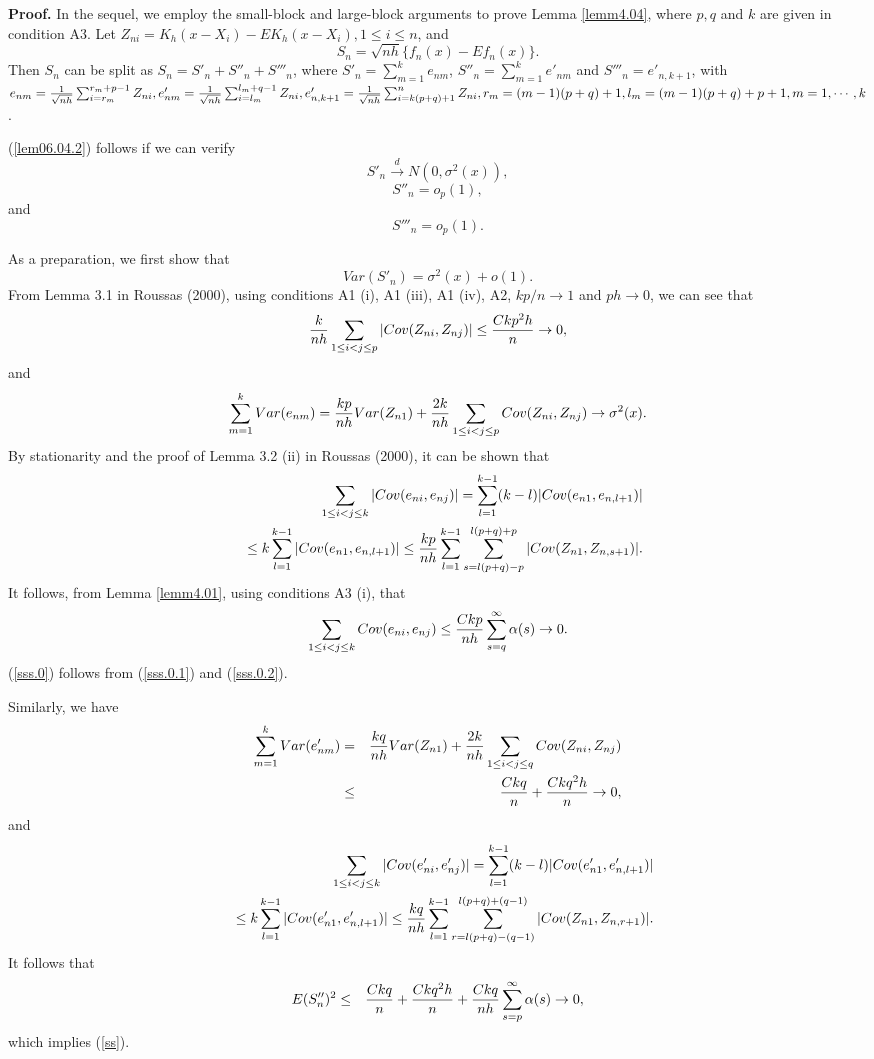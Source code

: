 \documentclass[12pt]{article}
\newcommand{\tod}{\stackrel{d}{\longrightarrow}}
\def\be{\begin{equation}}
\def\ee{\end{equation}}
\def\nn{\nonumber}
\def\bea{\begin{eqnarray}}
\def\eea{\end{eqnarray}}
\begin{document}
{\bf Proof. } In the sequel, we employ the small-block and large-block arguments to prove Lemma \ref{lemm4.04}, where $p, q$ and $k$ are given in condition A3. Let $Z_{ni}=K_h(x-X_i)-EK_h(x-X_i), 1\leq i\leq n$, and
\[
S_n=\sqrt{nh}\{f_n(x)-Ef_n(x)\}.
\]
Then $S_n$ can be split as
$S_n=S'_n+S''_n+S'''_n$, where
$S'_n=\sum_{m=1}^ke_{nm}$,
$S''_n=\sum_{m=1}^ke'_{nm}$ and
$S'''_n=e'_{n, k+1}$,
with
$e_{nm}={1\over \sqrt{nh}}\sum_{i=r_m}^{r_m+p-1}Z_{ni},
e'_{nm}={1\over \sqrt{nh}}\sum_{i=l_m}^{l_m+q-1}Z_{ni},
e'_{n, k+1}={1\over \sqrt{nh}}\sum_{i=k(p+q)+1}^nZ_{ni},
r_m=(m-1)(p+q)+1,l_m=(m-1)(p+q)+p+1, m=1,\cdots, k$.


 (\ref{lem06.04.2}) follows if we can verify
 \be S'_n
\tod N(0, \sigma^2(x)),\label{s}
\ee
\be
S''_n=o_p(1),\label{ss}
\ee
and
\be
S'''_n=o_p(1).\label{sss}
\ee

As a preparation, we first show that
\be
Var(S'_n)=\sigma^2(x)+o(1).\label{sss.0}
\ee
From Lemma 3.1 in Roussas (2000), using conditions A1 (i), A1 (iii), A1 (iv), A2, $kp/n\to 1$ and $ph\to 0$, we can see that
\[
{k\over nh}\sum_{1\leq i<j\leq p}  |Cov(Z_{ni}, Z_{nj})|\leq {Ckp^2h\over n}\to 0,
\]
and
\be
\sum_{m=1}^k Var(e_{nm})={kp\over nh} Var(Z_{n1})+{2k\over nh}\sum_{1\leq i<j\leq p}  Cov(Z_{ni}, Z_{nj}) \to \sigma^2(x).  \label{sss.0.1}
\ee
By stationarity and the proof of Lemma 3.2 (ii) in Roussas (2000), it can be shown that
\bea
&& \sum_{1\leq i<j\leq k}|Cov(e_{ni}, e_{nj})| = \sum^{k-1}_{l=1}(k-l)|Cov(e_{n1}, e_{n, l+1})|\nn\\
&&\leq k\sum^{k-1}_{l=1}|Cov(e_{n1}, e_{n, l+1})|
\leq  {kp\over nh}\sum^{k-1}_{l=1} \sum_{s=l(p+q)-p}^{l(p+q)+p}|Cov(Z_{n1}, Z_{n, s+1})|.\nn
\eea
It follows, from Lemma \ref{lemm4.01}, using conditions A3 (i), that
\be
 \sum_{1\leq i<j\leq k}Cov(e_{ni}, e_{nj}) \leq  {Ckp\over nh} \sum^{\infty}_{s=q}  \alpha (s) \to 0.
 \label{sss.0.2}
\ee
(\ref{sss.0}) follows from  (\ref{sss.0.1}) and (\ref{sss.0.2}).

Similarly, we have
\bea
\sum_{m=1}^k Var(e'_{nm}) &=& {kq\over nh} Var(Z_{n1})+{2k\over nh}\sum_{1\leq i<j\leq q}  Cov(Z_{ni}, Z_{nj})\nn\\
& \leq &  {Ckq\over n} + {Ckq^2h\over n}\to 0, \label{uselater1}
\eea
and
\bea
&& \sum_{1\leq i<j\leq k}|Cov(e'_{ni}, e'_{nj})| = \sum^{k-1}_{l=1}(k-l)|Cov(e'_{n1}, e'_{n, l+1})|\nn\\
&&\leq k\sum^{k-1}_{l=1}|Cov(e'_{n1}, e'_{n, l+1})|
\leq  {kq\over nh} \sum^{k-1}_{l=1} \sum_{r=l(p+q)-(q-1)}^{l(p+q)+(q-1)}|Cov(Z_{n1}, Z_{n, r+1})|.\nn
\eea
It follows that
\bea
 E(S''_n)^2
 & \leq & {Ckq\over n} + {Ckq^2h\over n}  +{Ckq\over nh} \sum^{\infty}_{s=p}  \alpha(s) \to 0, \label{ss.1}
\eea
which implies (\ref{ss}).
\end{document}
